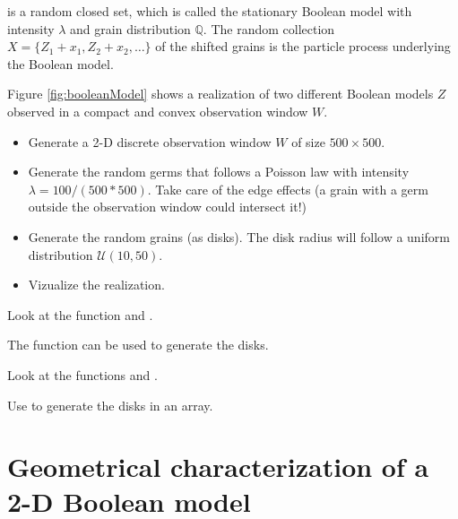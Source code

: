 \noindent is a random closed set, which is called the stationary Boolean model with intensity $\lambda$ and grain distribution $\mathbb{Q}$. The random collection $X=\{Z_1+x_1,Z_2+x_2,\dots\} $ of the shifted grains is the particle process underlying the Boolean model. 

Figure \ref{fig:booleanModel} shows a realization of two different Boolean models $Z$ observed in a compact and convex observation window $W$.



\begin{qbox}
\begin{itemize}
\item
Generate a 2-D discrete observation window $W$ of size $500 \times 500$.
\item
Generate the random germs that follows a Poisson law with intensity $\lambda=100/(500*500)$. Take care of the edge effects (a grain with a germ outside the observation window could intersect it!)
\item Generate the random grains (as disks). The disk radius will follow a uniform distribution $\mathcal{U}(10,50)$.
\item Vizualize the realization.
\end{itemize}
\end{qbox}

\begin{mcomment}
\begin{mremark}
 Look at the \matlabregistered{} function  and .
 
 The  function can be used to generate the disks.
\end{mremark}
\end{mcomment}

\begin{pcomment}
\begin{premark}
 Look at the  functions  and .
 
 Use  to generate the disks in an array.
\end{premark}
\end{pcomment}
\vspace*{-8pt}
\section{Geometrical characterization of a 2-D Boo\-lean mo\-del}\vspace*{-8pt}

